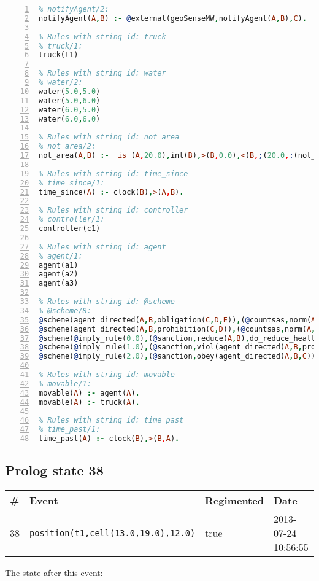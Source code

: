 \documentclass[11pt]{article}\usepackage[utf8]{inputenc}\usepackage{geometry}
\begin{document}
\begin{lstlisting}[language=Prolog, numbers=left]
% Rules with string id: notifyAgent
% notifyAgent/2:
notifyAgent(A,B) :- @external(geoSenseMW,notifyAgent(A,B),C).

% Rules with string id: truck
% truck/1:
truck(t1)

% Rules with string id: water
% water/2:
water(5.0,5.0)
water(5.0,6.0)
water(6.0,5.0)
water(6.0,6.0)

% Rules with string id: not_area
% not_area/2:
not_area(A,B) :-  is (A,20.0),int(B),>(B,0.0),<(B,;(20.0,:(not_area(A,B), is (-(B),20.0)))),int(A),>(A,0.0),<(A,;(20.0,:(area(A,B),-(int(A))))),int(B),>(A,0.0),>(B,0.0),<(A,21.0),<(B,21.0).

% Rules with string id: time_since
% time_since/1:
time_since(A) :- clock(B),>(A,B).

% Rules with string id: controller
% controller/1:
controller(c1)

% Rules with string id: agent
% agent/1:
agent(a1)
agent(a2)
agent(a3)

% Rules with string id: @scheme
% @scheme/8:
@scheme(agent_directed(A,B,obligation(C,D,E)),(@countsas,norm(A,B,F,obligation(C,D,E)),F),false,(listTrue(C)),(time_past(D)),false,[plus(viol(agent_directed(A,B,obligation(C,D,E))))|[]],[plus(obey(agent_directed(A,B,obligation(C,D,E))))|[]])
@scheme(agent_directed(A,B,prohibition(C,D)),(@countsas,norm(A,B,E,prohibition(C,D)),E),(listTrue(C)),false,(false),false,[plus(viol(agent_directed(A,B,prohibition(C,D))))|[]],[plus(obey(agent_directed(A,B,prohibition(C,D))))|[]])
@scheme(@imply_rule(0.0),(@sanction,reduce(A,B),do_reduce_health(A,B),notifyAgent(A,changed(status))),true,false,false,false,[min(reduce(A,B))|[]],[])
@scheme(@imply_rule(1.0),(@sanction,viol(agent_directed(A,B,prohibition(C,D))),do_sanction(D)),true,false,false,false,[min(viol(agent_directed(A,B,prohibition(C,D))))|[]],[])
@scheme(@imply_rule(2.0),(@sanction,obey(agent_directed(A,B,C))),true,false,false,false,[min(obey(agent_directed(A,B,C)))|[]],[])

% Rules with string id: movable
% movable/1:
movable(A) :- agent(A).
movable(A) :- truck(A).

% Rules with string id: time_past
% time_past/1:
time_past(A) :- clock(B),>(B,A).

\end{lstlisting}
\clearpage 
\subsection{Prolog state 38}
\begin{table}[ht]
\centering 
\begin{tabular}{l l l l} 
\textbf{\#} & \textbf{Event} & \textbf{Regimented} & \textbf{Date} \\ [0.5ex] 
\hline
38&\texttt{position(t1,cell(13.0,19.0),12.0)}&true&2013-07-24 10:56:55\\ [1ex] \hline\end{tabular}
\end{table}
The state after this event:
\end{document}
